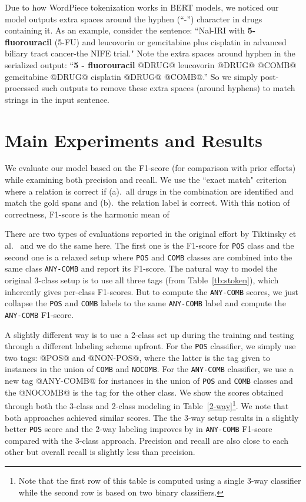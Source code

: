 \documentclass[conference]{IEEEtran}
\begin{document}
Due to how WordPiece tokenization works in BERT models, we noticed our model outputs extra spaces around the hyphen (``-'') character in drugs containing it. As an example, consider the sentence:  ``Nal-IRI with \textbf{5-fluorouracil} (5-FU) and leucovorin or gemcitabine plus cisplatin
in advanced biliary tract cancer-the NIFE trial."
Note the extra spaces around hyphen in the serialized output: 
``\textbf{5 - fluorouracil} @DRUG@ leucovorin @DRUG@ @COMB@ gemcitabine @DRUG@ 
cisplatin @DRUG@ @COMB@.''
So we simply post-processed such outputs to remove these extra spaces (around hyphens) to match strings in the input sentence. 




\section{Main Experiments and Results}
\label{sec-main-res}
We evaluate our model based on the F1-score (for comparison with prior efforts) while examining both precision and recall. We use the ``exact match" criterion where a relation is correct if (a).~all drugs in the combination are identified and match the gold spans and (b).~the relation label is correct. With this notion of correctness, F1-score is the harmonic mean of 



There are two types of evaluations reported in the original effort by Tiktinsky et al.~\cite{tiktinsky-etal-2022-dataset} and we do the same here. The first one is the F1-score for \texttt{POS} class and the second one is a relaxed setup where \texttt{POS} and \texttt{COMB} classes are combined into the same class \texttt{ANY-COMB} and report its F1-score. The natural way to model the original 3-class setup is to use all three tags (from Table~\ref{tb:stoken}), which inherently gives per-class F1-scores. But to compute the \texttt{ANY-COMB} scores, we just collapse the \texttt{POS} and \texttt{COMB} labels to the same \texttt{ANY-COMB} label and compute the \texttt{ANY-COMB} F1-score. 

A slightly different way is to use a 2-class set up during the training and testing through a different labeling scheme upfront. For the  \texttt{POS} classifier, we simply use two tags: @POS@ and @NON-POS@, where the latter is the tag given to instances in the union of \texttt{COMB} and \texttt{NOCOMB}. For the \texttt{ANY-COMB} classifier, we use a new tag @ANY-COMB@ for instances in the union of \texttt{POS} and \texttt{COMB} classes and the @NOCOMB@ is the tag for the other class. 
We show the scores obtained through both the 3-class and 2-class modeling in Table~\ref{2-way}\footnote{Note that the first row of this table is computed using a single 3-way classifier while the second row is based on two binary classifiers.}. We note that both approaches achieved similar scores. The the 3-way setup results in a slightly better \texttt{POS} score and the 2-way labeling improves by  in \texttt{ANY-COMB} F1-score compared with the 3-class approach.  Precision and recall are also close to each other but overall recall is slightly less than precision.
\end{document}
